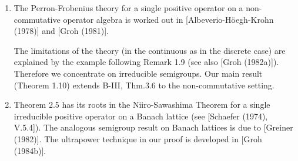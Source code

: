 \begin{enumerate}[label=\emph{Section \arabic*:}, wide]

\item
The Perron-Frobenius theory for a single positive operator on a non-commutative operator algebra is worked out in [Albeverio-Höegh-Krohn (1978)] and [Groh (1981)].






The limitations of the theory (in the continuous as in the discrete case)
are explained by the example following Remark 1.9 (see also [Groh (1982a)]).
Therefore we concentrate on irreducible semigroups.
Our main result (Theorem 1.10) extends B-III, Thm.3.6 to the non-commutative setting.

\item
Theorem 2.5 has its roots in the Niiro-Sawashima Theorem for a single irreducible positive operator on a Banach lattice (see [Schaefer (1974), V.5.4]).
The analogous semigroup result on Banach lattices is due to [Greiner (1982)].
The ultrapower technique in our proof is developed in [Groh (1984b)].

\end{enumerate}





































